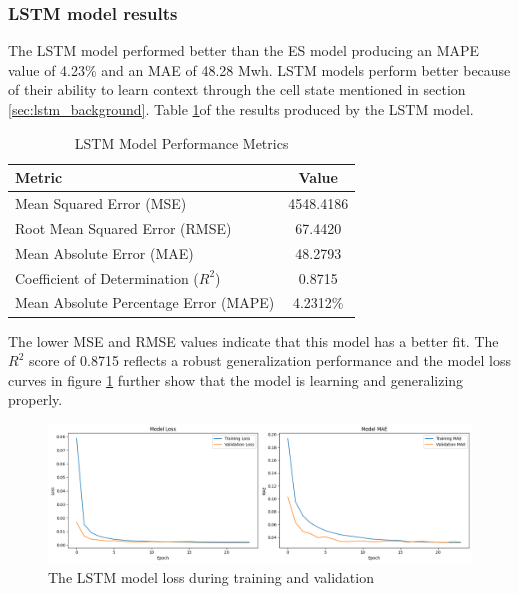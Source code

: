 \subsubsection{LSTM model results}
The LSTM model performed better than the ES model producing an MAPE value of 4.23\% and an MAE of 48.28 Mwh. LSTM models perform better because of their ability to learn context through the cell state mentioned in section \ref{sec:lstm_background}. Table \ref{tab:lstm_performance}of the results produced by the LSTM model.
\begin{table}[h]
	\centering
	\caption{LSTM Model Performance Metrics}
	\label{tab:lstm_performance}
	\begin{tabular}{lc}
		\hline
		\textbf{Metric} & \textbf{Value} \\
		\hline
		Mean Squared Error (MSE) & 4548.4186 \\
		Root Mean Squared Error (RMSE) & 67.4420 \\
		Mean Absolute Error (MAE) & 48.2793 \\
		Coefficient of Determination ($R^2$) & 0.8715 \\
		Mean Absolute Percentage Error (MAPE) & 4.2312\% \\
		\hline
	\end{tabular}
\end{table}
 The lower MSE and RMSE values indicate that this model has a better fit. The $R^2$ score of 0.8715 reflects a robust generalization performance and the model loss curves in figure \ref{fig:lstmmodel-loss} further show that the model is learning and generalizing properly.\begin{figure}[h]
 	\centering
 	\includegraphics[width=0.9\linewidth]{"Chapters/images/results/lstm_model loss"}
 	\caption{The LSTM model loss during training and validation}
 	\label{fig:lstmmodel-loss}
 \end{figure}
 

